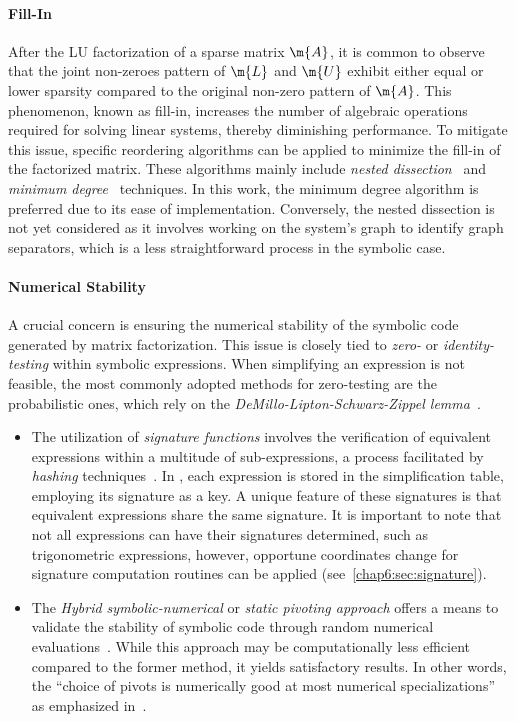 \paragraph{Fill-In} After the \ac{LU} factorization of a sparse matrix $\m{A}$, it is common to observe that the joint non-zeroes pattern of $\m{L}$ and $\m{U}$ exhibit either equal or lower sparsity compared to the original non-zero pattern of $\m{A}$. This phenomenon, known as fill-in, increases the number of algebraic operations required for solving linear systems, thereby diminishing performance. To mitigate this issue, specific reordering algorithms can be applied to minimize the fill-in of the factorized matrix. These algorithms mainly include \emph{nested dissection}~\cite{george1973nested, lipton1979generalized} and \emph{minimum degree}~\cite{markowitz1957elimination, rose1970symmetric} techniques. In this work, the minimum degree algorithm is preferred due to its ease of implementation. Conversely, the nested dissection is not yet considered as it involves working on the system's graph to identify graph separators, which is a less straightforward process in the symbolic case.

\paragraph{Numerical Stability} A crucial concern is ensuring the numerical stability of the symbolic code generated by matrix factorization. This issue is closely tied to \emph{zero-} or \emph{identity-testing} within symbolic expressions. When simplifying an expression is not feasible, the most commonly adopted methods for zero-testing are the probabilistic ones, which rely on the \emph{DeMillo-Lipton-Schwarz-Zippel lemma}~\cite{demillo1978probabilistic, schwartz1980fast, zippel1979probabilistic}.
%
\begin{itemize}
    \item The utilization of \emph{signature functions} involves the verification of equivalent expressions within a multitude of sub-expressions, a process facilitated by \emph{hashing} techniques~\cite{gonnet1984determining, char1984design, gonnet1986results, monagan1994signature}. In \Maple{}, each expression is stored in the simplification table, employing its signature as a key. A unique feature of these signatures is that equivalent expressions share the same signature. It is important to note that not all expressions can have their signatures determined, such as trigonometric expressions, however, opportune coordinates change for signature computation routines can be applied (see~\ref{chap6:sec:signature}).
    \item The \emph{Hybrid symbolic-numerical} or \emph{static pivoting approach} offers a means to validate the stability of symbolic code through random numerical evaluations~\cite{giesbrecht2014symbolic, li1998making}. While this approach may be computationally less efficient compared to the former method, it yields satisfactory results. In other words, the ``choice of pivots is numerically good at most numerical specializations'' as emphasized in~\cite{giesbrecht2014symbolic}.
\end{itemize}

